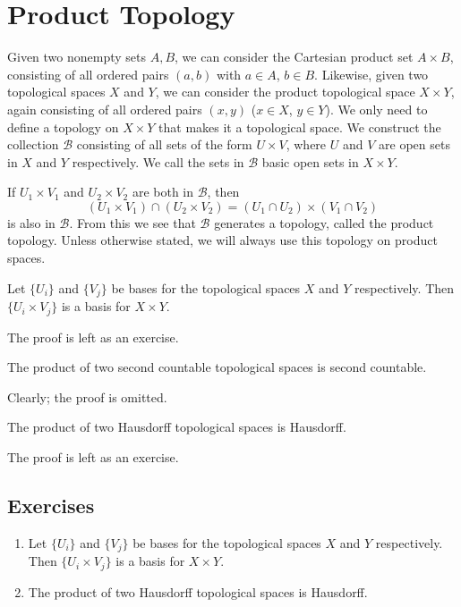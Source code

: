 \section{Product Topology}\label{subsec:product_top}

Given two nonempty sets $A,B$, we can consider the Cartesian product set
$A\times B$, consisting of all ordered pairs $(a,b)$ with $a\in A$, $b\in B$.
Likewise, given two topological spaces $X$ and $Y$, we can consider the
product topological space $X\times Y$, again consisting of all ordered pairs
$(x,y)$ ($x\in X$, $y\in Y$). We only need to define a topology on $X\times
	Y$ that makes it a topological space. We construct the collection
$\mathcal{B}$ consisting of all sets of the form $U\times V$, where $U$ and
$V$ are open sets in $X$ and $Y$ respectively. We call the sets in
$\mathcal{B}$ basic open sets in $X\times Y$.

If $U_1\times V_1$ and $U_2\times V_2$ are both in $\mathcal{B}$, then
\begin{displaymath}
	(U_1\times V_1)\cap (U_2\times V_2) = (U_1\cap U_2)\times (V_1\cap
	V_2)
\end{displaymath}
is also in $\mathcal{B}$. From this we see that $\mathcal{B}$ generates a
topology, called the product topology. Unless otherwise stated, we will always
use this topology on product spaces.


\begin{proposition}
	Let $\{U_i\}$ and $\{V_j\}$ be bases for the topological spaces $X$ and
	$Y$ respectively. Then $\{U_i\times V_j\}$ is a basis for $X\times Y$.
\end{proposition}

The proof is left as an exercise.


\begin{corollary}
	The product of two second countable topological spaces is second
	countable.
\end{corollary}
Clearly; the proof is omitted.


\begin{proposition}
	The product of two Hausdorff topological spaces is Hausdorff.
\end{proposition}

The proof is left as an exercise.

\subsection{Exercises}

\begin{enumerate}
	\item   Let $\{U_i\}$ and $\{V_j\}$ be bases for the topological spaces
	      $X$ and $Y$ respectively. Then $\{U_i\times V_j\}$ is a basis for
	      $X\times Y$.


	\item  The product of two Hausdorff topological spaces is Hausdorff.
\end{enumerate}





